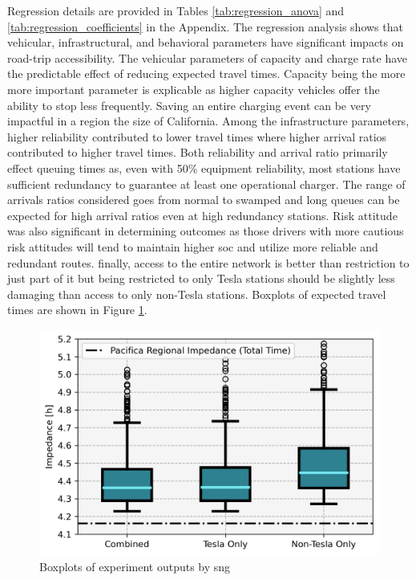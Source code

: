 \documentclass[11pt]{article}
\begin{document}
\begin{multicols}{2}
Regression details are provided in Tables \ref{tab:regression_anova} and \ref{tab:regression_coefficients} in the Appendix. The regression analysis shows that vehicular, infrastructural, and behavioral parameters have significant impacts on road-trip accessibility. The vehicular parameters of capacity and charge rate have the predictable effect of reducing expected travel times. Capacity being the more more important parameter is explicable as higher capacity vehicles offer the ability to stop less frequently. Saving an entire charging event can be very impactful in a region the size of California. Among the infrastructure parameters, higher reliability contributed to lower travel times where higher arrival ratios contributed to higher travel times. Both reliability and arrival ratio primarily effect queuing times as, even with 50\% equipment reliability, most stations have sufficient redundancy to guarantee at least one operational charger. The range of arrivals ratios considered goes from normal to swamped and long queues can be expected for high arrival ratios even at high redundancy stations. Risk attitude was also significant in determining outcomes as those drivers with more cautious risk attitudes will tend to maintain higher \gls{soc} and utilize more reliable and redundant routes. finally, access to the entire network is better than restriction to just part of it but being restricted to only Tesla stations should be slightly less damaging than access to only non-Tesla stations. Boxplots of expected travel times are shown in Figure \ref{fig:networks_boxplots}.

\begin{figure}[H]
	\centering
	\includegraphics[width = \linewidth]{figs/Networks_Boxplots_Weighted_Impedance.png}
	\caption{Boxplots of experiment outputs by \gls{sng}}
	\label{fig:networks_boxplots}
\end{figure}


\end{multicols}
\end{document}
